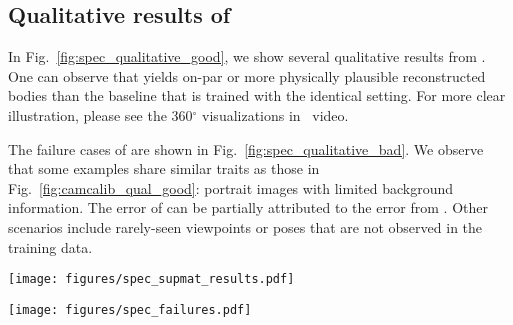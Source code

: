 \documentclass[10pt,twocolumn,letterpaper,usenames,dvipsnames]{article}
\begin{document}
\subsection{Qualitative results of \methodname}
In Fig.~\ref{fig:spec_qualitative_good}, we show several qualitative results from \methodname. 
One can observe that \methodname yields on-par or more physically plausible reconstructed bodies than the baseline that is trained with the identical setting.
For more clear illustration, please see the 360$^\circ$ visualizations in \supmat~video.

The failure cases of \methodname are shown in Fig.~\ref{fig:spec_qualitative_bad}. 
We observe that some examples share similar traits as those in Fig.~\ref{fig:camcalib_qual_good}: portrait images with limited background information. 
The error of \methodname can be partially attributed to the error from \camcalib.
Other scenarios include rarely-seen viewpoints or poses that are not observed in the training data.


\begin{figure*}
    \centering
    \texttt{[image: figures/spec\_supmat\_results.pdf]}
    \caption{\textbf{SPEC qualitative results.}}
    \label{fig:spec_qualitative_good}
\end{figure*}

\begin{figure*}
    \centering
    \texttt{[image: figures/spec\_failures.pdf]}
    \caption{\textbf{SPEC failures.}}
    \label{fig:spec_qualitative_bad}
\end{figure*}
 
\end{document}
